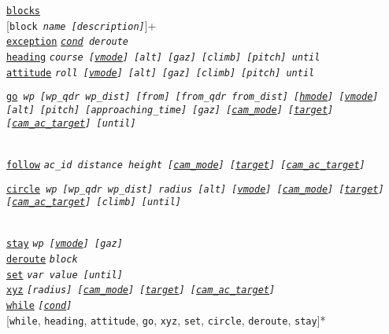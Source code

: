 \documentclass{article}
\renewcommand{\tt}[1]{\texttt{#1}}
\newcommand{\hs}[1]{\hspace*{#1cm}}
\begin{document}
\begin{minipage}[ctb]{\textwidth}
	\hs{0.5} \hyperlink{blocks}{\tt{blocks}} \\
		\hs{1} [\tt{block \emph{name [description]}}]+ \\
			\hs{1.5} \hyperlink{exceptions}{\tt{exception}} \tt{\emph{\tt{\hyperlink{cond}{cond}} deroute}} \\
			\hs{1.5} \hyperlink{heading}{\tt{heading}} \tt{\emph{course [\hyperlink{verticalmodes}{vmode}] [alt] [gaz] [climb] [pitch] until}} \\
			\hs{1.5} \hyperlink{attitude}{\tt{attitude}} \tt{\emph{roll [\hyperlink{verticalmodes}{vmode}] [alt] [gaz] [climb] [pitch] until}} \\
			\hs{1.5} \parbox[]{13cm}{\tt{\hyperlink{go}{go} \emph{wp [wp\_qdr wp\_dist] [from] [from\_qdr from\_dist] [\hyperlink{horizontalmodes}{hmode}] [\hyperlink{verticalmodes}{vmode}] [alt] [pitch] [approaching\_time] [gaz] [\hyperlink{cam}{cam\_mode}] [\hyperlink{cam}{target}] [\hyperlink{cam}{cam\_ac\_target}] [until]}}} \\
			\hs{1.5} \hyperlink{follow}{\tt{follow}} \tt{\emph{ac\_id distance height [\hyperlink{cam}{cam\_mode}] [\hyperlink{cam}{target}] [\hyperlink{cam}{cam\_ac\_target}]}} \\
			\hs{1.5} \parbox[]{13cm}{\tt{\hyperlink{circle}{circle} \emph{wp [wp\_qdr wp\_dist] radius [alt] [\hyperlink{verticalmodes}{vmode}] [\hyperlink{cam}{cam\_mode}] [\hyperlink{cam}{target}] [\hyperlink{cam}{cam\_ac\_target}] [climb] [until]}}} \\
			\hs{1.5} \hyperlink{stay}{\tt{stay}} \tt{\emph{wp [\hyperlink{verticalmodes}{vmode}] [gaz]}} \\
			\hs{1.5} \hyperlink{deroute}{\tt{deroute}} \tt{\emph{block}} \\
			\hs{1.5} \hyperlink{set}{\tt{set}} \tt{\emph{var value [until]}} \\
			\hs{1.5} \hyperlink{xyz}{\tt{xyz}} \tt{\emph{[radius] [\hyperlink{cam}{cam\_mode}] [\hyperlink{cam}{target}] [\hyperlink{cam}{cam\_ac\_target}]}} \\
			\hs{1.5} \hyperlink{while}{\tt{while}} \tt{\emph{[\tt{\hyperlink{cond}{cond}}]}} \\
				\hs{2} [\tt{while}, \tt{heading}, \tt{attitude}, \tt{go}, \tt{xyz}, \tt{set}, \tt{circle}, \tt{deroute}, \tt{stay}]* \\
\end{minipage}

\pagebreak


\end{document}
